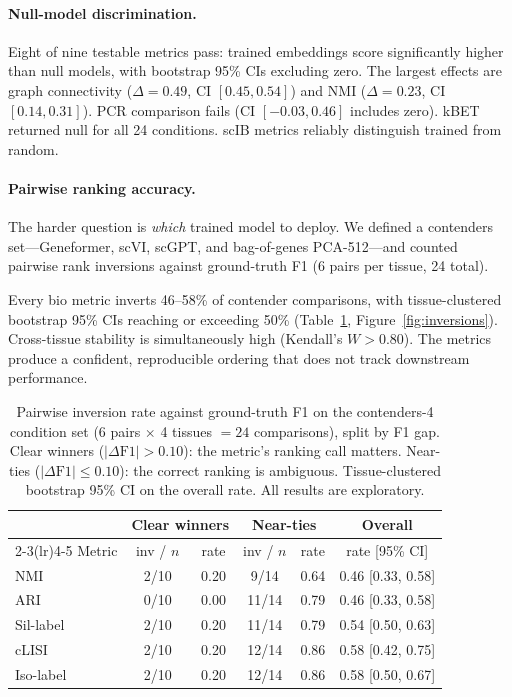 \documentclass[11pt]{article}
\begin{document}
\paragraph{Null-model discrimination.} Eight of nine testable metrics pass: trained embeddings score significantly higher than null models, with bootstrap 95\% CIs excluding zero. The largest effects are graph connectivity ($\Delta = 0.49$, CI $[0.45, 0.54]$) and NMI ($\Delta = 0.23$, CI $[0.14, 0.31]$). PCR comparison fails (CI $[-0.03, 0.46]$ includes zero). kBET returned null for all 24 conditions. scIB metrics reliably distinguish trained from random.

\paragraph{Pairwise ranking accuracy.} The harder question is \emph{which} trained model to deploy. We defined a contenders set---Geneformer, scVI, scGPT, and bag-of-genes PCA-512---and counted pairwise rank inversions against ground-truth F1 (6 pairs per tissue, 24 total).

Every bio metric inverts 46--58\% of contender comparisons, with tissue-clustered bootstrap 95\% CIs reaching or exceeding 50\% (Table~\ref{tab:scib_inversions}, Figure~\ref{fig:inversions}). Cross-tissue stability is simultaneously high (Kendall's $W > 0.80$). The metrics produce a confident, reproducible ordering that does not track downstream performance.

\begin{table}[t]
\centering
\caption{Pairwise inversion rate against ground-truth F1 on the contenders-4 condition set (6 pairs $\times$ 4 tissues $= 24$ comparisons), split by F1 gap. Clear winners ($|\Delta\text{F1}| > 0.10$): the metric's ranking call matters. Near-ties ($|\Delta\text{F1}| \leq 0.10$): the correct ranking is ambiguous. Tissue-clustered bootstrap 95\% CI on the overall rate. All results are exploratory.}
\label{tab:scib_inversions}
\small
\begin{tabular}{@{}lccccc@{}}
\toprule
 & \multicolumn{2}{c}{Clear winners} & \multicolumn{2}{c}{Near-ties} & Overall \\
\cmidrule(lr){2-3}\cmidrule(lr){4-5}
Metric & inv / $n$ & rate & inv / $n$ & rate & rate [95\% CI] \\
\midrule
NMI       & 2/10 & 0.20 & 9/14  & 0.64 & 0.46 [0.33, 0.58] \\
ARI       & 0/10 & 0.00 & 11/14 & 0.79 & 0.46 [0.33, 0.58] \\
Sil-label & 2/10 & 0.20 & 11/14 & 0.79 & 0.54 [0.50, 0.63] \\
cLISI     & 2/10 & 0.20 & 12/14 & 0.86 & 0.58 [0.42, 0.75] \\
Iso-label & 2/10 & 0.20 & 12/14 & 0.86 & 0.58 [0.50, 0.67] \\
\bottomrule
\end{tabular}
\end{table}
\end{document}
